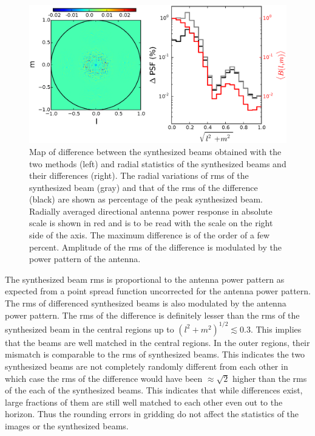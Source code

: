 \documentclass[a4paper,fleqn,usenatbib]{mnras}
\begin{document}
\begin{figure}
  \includegraphics[width=\columnwidth]{figure8}
  \caption{Map of difference between the synthesized beams obtained with the 
    two methods (left) and radial statistics of the synthesized beams and 
    their differences (right). The radial variations of rms of the synthesized 
    beam (gray) and that of the rms of the difference (black) are shown as 
    percentage of the peak synthesized beam. Radially averaged directional 
    antenna power response in absolute scale is shown in red and is to be read 
    with the scale on the right side of the axis. The maximum difference is of 
    the order of a few percent. Amplitude of the rms of the difference is 
    modulated by the power pattern of the antenna.}
  \label{fig:psf-diff}
\end{figure}

The synthesized beam rms is proportional to the antenna power pattern as 
expected from a point spread function uncorrected for the antenna power pattern. 
The rms of differenced synthesized beams is also modulated by the antenna power 
pattern. The rms of the difference is definitely lesser than the rms of the 
synthesized beam in the central regions up to $(l^2+m^2)^{1/2}\lesssim 0.3$. This 
implies that the beams are well matched in the central regions. In the outer 
regions, their mismatch is comparable to the rms of synthesized beams. This 
indicates the two synthesized beams are not completely randomly different from 
each other in which case the rms of the difference would have been 
$\approx \sqrt{2}$ higher than the rms of the each of the synthesized beams. 
This indicates that while differences exist, large fractions of them are still 
well matched to each other even out to the horizon. Thus the rounding errors in 
gridding do not affect the statistics of the images or the synthesized beams.
\end{document}
